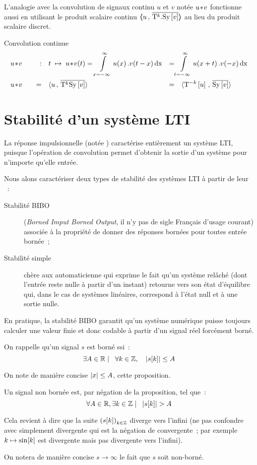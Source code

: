 L'analogie avec la convolution de signaux continu $u$ et $v$ notée
$u\!\ast\! v$ fonctionne aussi en utilisant le produit scalaire continu
$\langle\!\!\langle u\,,\,\overline{\mathrm{T}^k.\mathrm{Sy}\left[v\right]}\rangle\!\!\rangle$ au lieu du produit scalaire discret.

\begin{definition}{Convolution continue}
  \begin{align}
    \label{eq:convolution_continue}
    &u\conv v \quad &:& \quad  t \;\mapsto\; u\conv v\de{t} =\integ{x=-\infty}{\infty}{u\de{x}.v\de{t-x}\dx} &=& \integ{t=-\infty}{\infty}{u\de{x+t}.v\de{-x}\dx} \nonumber\\
    &u\conv v & = & \quad \scal{u}{\conj{\oret^k\Sy\b{v}}} &=& \quad\scal{\oret^{-k}\b{u}}{\conj{\Sy\b{v}}} 
  \end{align}
\end{definition}


\section{Stabilité d'un système LTI}

La réponse impulsionnelle (notée \RIP{}) caractérise entièrement un
système LTI, puisque l'opération de convolution permet d'obtenir la
sortie d'un système pour n'importe qu'elle entrée.

Nous alons caractériser deux types de stabilité des systèmes LTI à
partir de leur \RIP{}~:
\begin{description}
\item[Stabilité BIBO] (\emph{Borned Imput Borned Output}, il n'y pas
  de sigle Français d'usage courant) associée à la propriété de donner
  des réponses bornées pour toutes entrée bornée~;
\item[Stabilité simple] chère aux automaticienne qui exprime le fait
  qu'un système relâché (dont l'entrée reste nulle à partir d'un
  instant) retourne vers son état d'équilibre qui, dans le cas de
  systèmes linéaires, correspond à l'état null et à une sortie nulle.
\end{description}

En pratique, la stabilité BIBO garantit qu'un système numérique puisse
toujours calculer une valeur finie et donc codable à partir d'un
signal réel forcément borné.

\begin{remarque}
  On rappelle qu'un signal $s$ est borné ssi~:
  $$\exists A\in\mathbb{R} \mathrel{}\mid\mathrel{} \;\;{} \forall k\in \mathbb{Z}, \quad \left|s\!\left[k\right]\right|\leq A $$

  On note de manière concise $\left|x\right|\leq A$, cette proposition.

  Un signal non bornée est, par négation de la proposition, tel que~:
  $$\forall A\in\mathbb{R}, \exists k\in \mathbb{Z} \mathrel{}\mid\mathrel{} \;\;  \left|s\!\left[k\right]\right| > A $$

  Cela revient à dire que la suite $\left(s\!\left[k\right]\right)_{k\in\mathbb{Z}}$ diverge
  vers l'infini (ne pas confondre avec simplement divergente qui est
  la négation de convergente~; par exemple $k\mapsto \sin\!\left[k\right]$ est
  divergente mais pas divergente vers l'infini).

  On notera de manière concise $s\to\infty$ le fait que $s$ soit
  non-borné.
  
\end{remarque}

